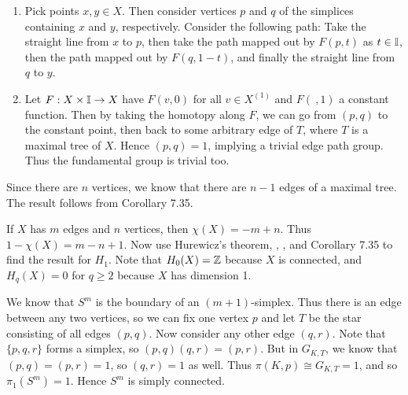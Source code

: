 \documentclass[../../solutions.tex]{subfiles}
\begin{document}
\begin{exercise} \leavevmode
\begin{enumerate}
\item
Pick points $x,y\in X$.
Then consider vertices $p$ and $q$ of the simplices containing $x$ and $y$, respectively.
Consider the following path:
Take the straight line from $x$ to $p$, then take the path mapped out by $F(p,t)$ as $t\in\mathbb I$, then the path mapped out by $F(q,1-t)$, and finally the straight line from $q$ to $y$.

\item
Let $F:X\times\mathbb I\to X$ have $F(v,0)$ for all $v\in X^{(1)}$ and $F(~,1)$ a constant function.
Then by taking the homotopy along $F$, we can go from $(p,q)$ to the constant point, then back to some arbitrary edge of $T$, where $T$ is a maximal tree of $X$.
Hence $(p,q)=1$, implying a trivial edge path group.
Thus the fundamental group is trivial too.
\end{enumerate}
\end{exercise}

\begin{exercise} \leavevmode
Since there are $n$ vertices, we know that there are $n-1$ edges of a maximal tree.
The result follows from Corollary 7.35.
\end{exercise}

\begin{exercise} \leavevmode
If $X$ has $m$ edges and $n$ vertices, then $\chi(X)=-m+n$.
Thus $1-\chi(X)=m-n+1$.
Now use Hurewicz's theorem, , , and Corollary 7.35 to find the result for $H_1$.
Note that $H_0(X)=\mathbb{Z}$ because $X$ is connected, and $H_q(X)=0$ for $q\ge2$ because $X$ has dimension 1.
\end{exercise}

\begin{exercise} \leavevmode
We know that $S^m$ is the boundary of an $(m+1)$-simplex.
Thus there is an edge between any two vertices, so we can fix one vertex $p$ and let $T$ be the star consisting of all edges $(p,q)$.
Now consider any other edge $(q,r)$.
Note that $\{p,q,r\}$ forms a simplex, so $(p,q)(q,r)=(p,r)$.
But in $G_{K,T}$, we know that $(p,q)=(p,r)=1$, so $(q,r)=1$ as well.
Thus $\pi(K,p)\cong G_{K,T}=1$, and so $\pi_1(S^m)=1$.
Hence $S^m$ is simply connected.
\end{exercise}
\end{document}
